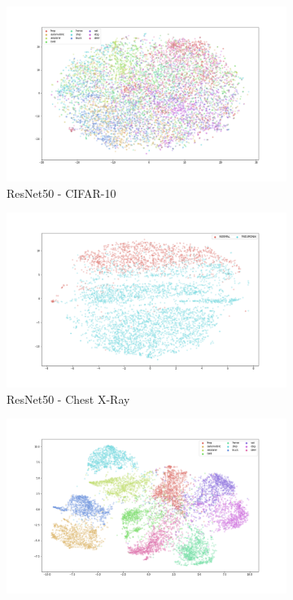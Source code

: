 \documentclass{article}
\theoremstyle{definition}
\begin{document}
\begin{figure}[h!]
    \centering
    \begin{subfigure}{.48\textwidth}
        \includegraphics[width=\linewidth]{Final project/img/CIFAR10_RESNET50_train.png}
        \caption{ResNet50 - CIFAR-10}
    \end{subfigure}
    \begin{subfigure}{.48\textwidth}
        \includegraphics[width=\linewidth]{Final project/img/ChestXRay_RESNET50_train.png}
        \caption{ResNet50 - Chest X-Ray}
    \end{subfigure}
    \begin{subfigure}{.48\textwidth}
        \includegraphics[width=\linewidth]{Final project/img/CIFAR10_clip-vit-base-patch32_train.png}

\end{subfigure}
\end{figure}
\end{document}
